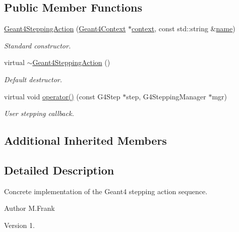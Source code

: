 \subsection*{Public Member Functions}
\begin{DoxyCompactItemize}
\item 
\hyperlink{class_d_d4hep_1_1_simulation_1_1_geant4_stepping_action_a0d2be4a83d09e78b27f6f5eb0977260d}{Geant4\+Stepping\+Action} (\hyperlink{class_d_d4hep_1_1_simulation_1_1_geant4_context}{Geant4\+Context} $\ast$\hyperlink{class_d_d4hep_1_1_simulation_1_1_geant4_action_aa9d87f0ec2a72b7fc2591b18f98d75cf}{context}, const std\+::string \&\hyperlink{class_d_d4hep_1_1_simulation_1_1_geant4_action_af374e70b014d16afb81dd9d77cc3894b}{name})
\begin{DoxyCompactList}\small\item\em Standard constructor. \end{DoxyCompactList}\item 
virtual \hyperlink{class_d_d4hep_1_1_simulation_1_1_geant4_stepping_action_a906c5651b3a3f39a44b4a3b5ab236375}{$\sim$\+Geant4\+Stepping\+Action} ()
\begin{DoxyCompactList}\small\item\em Default destructor. \end{DoxyCompactList}\item 
virtual void \hyperlink{class_d_d4hep_1_1_simulation_1_1_geant4_stepping_action_ab6b61f6eaed6d06ddb3a7ed319258317}{operator()} (const G4\+Step $\ast$step, G4\+Stepping\+Manager $\ast$mgr)
\begin{DoxyCompactList}\small\item\em User stepping callback. \end{DoxyCompactList}\end{DoxyCompactItemize}
\subsection*{Additional Inherited Members}


\subsection{Detailed Description}
Concrete implementation of the Geant4 stepping action sequence. 

\begin{DoxyAuthor}{Author}
M.\+Frank 
\end{DoxyAuthor}
\begin{DoxyVersion}{Version}
1. 
\end{DoxyVersion}


